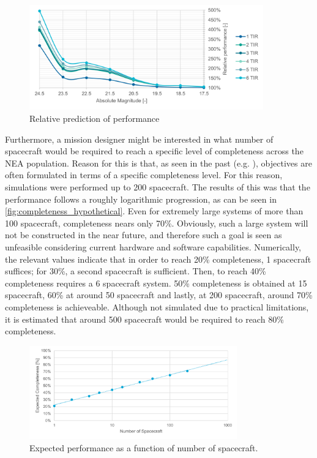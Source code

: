 \begin{figure}[htbp]
 \centering
 \includegraphics[width=0.9\textwidth]{img/performance_prediction_rel.pdf}
 \caption{Relative prediction of performance}
 \label{fig:performance_prediction_rel}
\end{figure}

Furthermore, a mission designer might be interested in what number of spacecraft would be required to reach a specific level of completeness across the NEA population. Reason for this is that, as seen in the past (e.g. \cite{2003NEOSDT}), objectives are often formulated in terms of a specific completeness level. For this reason, simulations were performed up to 200 spacecraft. The results of this was that the performance follows a roughly logarithmic progression, as can be seen in \autoref{fig:completeness_hypothetical}. Even for extremely large systems of more than 100 spacecraft, completeness nears only 70\%. Obviously, such a large system will not be constructed in the near future, and therefore such a goal is seen as unfeasible considering current hardware and software capabilities. Numerically, the relevant values indicate that in order to reach 20\% completeness, 1 spacecraft suffices; for 30\%, a second spacecraft is sufficient. Then, to reach 40\% completeness requires a 6 spacecraft system. 50\% completeness is obtained at 15 spacecraft, 60\% at around 50 spacecraft and lastly, at 200 spacecraft, around 70\% completeness is achieveable. Although not simulated due to practical limitations, it is estimated that around 500 spacecraft would be required to reach 80\% completeness.

\begin{figure}[htbp]
 \centering
 \includegraphics[width=0.8\textwidth]{img/completeness_hypothetical.pdf}
 \caption{Expected performance as a function of number of spacecraft.}
 \label{fig:completeness_hypothetical}
\end{figure}


